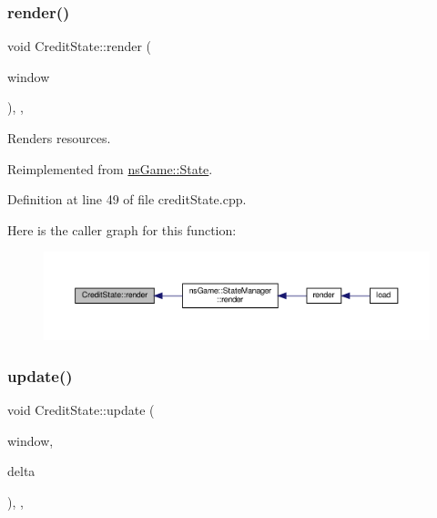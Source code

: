 \subsubsection{\texorpdfstring{render()}{render()}}
{\footnotesize\ttfamily void Credit\+State\+::render (\begin{DoxyParamCaption}\item[{Min\+GL \&}]{window }\end{DoxyParamCaption})\hspace{0.3cm}{\ttfamily [inline]}, {\ttfamily [override]}, {\ttfamily [virtual]}}



Renders resources. 



Reimplemented from \hyperlink{structns_game_1_1_state_a214f8ee52de4b318f1ed3861a578ce67}{ns\+Game\+::\+State}.



Definition at line 49 of file credit\+State.\+cpp.

Here is the caller graph for this function\+:\nopagebreak
\begin{figure}[H]
\begin{center}
\leavevmode
\includegraphics[width=350pt]{class_credit_state_aa4ba316fca29d0e79ee70891e373a060_icgraph}
\end{center}
\end{figure}
\mbox{\label{class_credit_state_a52a92d650fce22fa08b37359c3a5aa64}} 
\subsubsection{\texorpdfstring{update()}{update()}}
{\footnotesize\ttfamily void Credit\+State\+::update (\begin{DoxyParamCaption}\item[{Min\+GL \&}]{window,  }\item[{unsigned}]{delta }\end{DoxyParamCaption})\hspace{0.3cm}{\ttfamily [inline]}, {\ttfamily [override]}, {\ttfamily [virtual]}}



